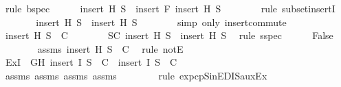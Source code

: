 \begin{isabellebody}
\ {\isacharparenleft}rule\ bspec{\isacharparenright}\isanewline
\ \ \ \ \isamarkupfalse%
\ {\isachardoublequoteopen}insert\ H\ S{}\ {\isasymsubseteq}\ insert\ F\ {\isacharparenleft}insert\ H\ S{}{\isacharparenright}{\isachardoublequoteclose}\isanewline
\ \ \ \ \ \ \isamarkupfalse%
\ {\isacharparenleft}rule\ subset{\isacharunderscore}insertI{\isacharparenright}\isanewline
\ \ \ \ \isamarkupfalse%
\ \isamarkupfalse%
\ {\isachardoublequoteopen}insert\ H\ S{}\ {\isasymsubseteq}\ insert\ H\ {\isacharquery}S{}{\isachardoublequoteclose}\isanewline
\ \ \ \ \ \ \isamarkupfalse%
\ {\isacharparenleft}simp\ only{\isacharcolon}\ insert{\isacharunderscore}commute{\isacharparenright}\isanewline
\ \ \ \ \isamarkupfalse%
\ {\isachardoublequoteopen}insert\ H\ S{}\ {\isasymin}\ C{\isachardoublequoteclose}\isanewline
\ \ \ \ \ \ \isamarkupfalse%
\ SC{}\ {\isacartoucheopen}insert\ H\ S{}\ {\isasymsubseteq}\ insert\ H\ {\isacharquery}S{}{\isacartoucheclose}\ \isamarkupfalse%
\ {\isacharparenleft}rule\ sspec{\isacharparenright}\isanewline
\ \ \ \ \isamarkupfalse%
\ {\isachardoublequoteopen}False{\isachardoublequoteclose}\isanewline
\ \ \ \ \ \ \isamarkupfalse%
\ assms{\isacharparenleft}{}{}{\isacharparenright}\ {\isacartoucheopen}insert\ H\ S{}\ {\isasymin}\ C{\isacartoucheclose}\ \isamarkupfalse%
\ {\isacharparenleft}rule\ notE{\isacharparenright}\isanewline
\ \ \isamarkupfalse%
\isanewline
\ \ \isamarkupfalse%
\ Ex{\isacharcolon}{\isachardoublequoteopen}{\isasymexists}I\ {\isasymin}\ {\isacharbraceleft}G{\isacharcomma}H{\isacharbraceright}{\isachardot}\ insert\ I\ {\isacharquery}S{}\ {\isasymin}\ C\ {\isasymand}\ insert\ I\ {\isacharquery}S{}\ {\isasymin}\ C{\isachardoublequoteclose}\isanewline
\ \ \ \ \isamarkupfalse%
\ assms{\isacharparenleft}{}{\isacharparenright}\ assms{\isacharparenleft}{}{\isacharparenright}\ assms{\isacharparenleft}{}{\isacharparenright}\ assms{\isacharparenleft}{}{\isacharparenright}\ {}\ {}\ {}\ {}\ {}\ {}\ \isamarkupfalse%
\ {\isacharparenleft}rule\ ex{}{\isacharunderscore}pcp{\isacharunderscore}SinE{\isacharunderscore}DIS{\isacharunderscore}auxEx{\isacharparenright}\isanewline

\end{isabellebody}
